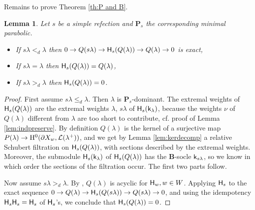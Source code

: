 \documentclass[sn-mathphys-num]{sn-jnl}%
\newcommand{\Ll}{\mathcal L}
\newcommand{\sk}{{\sf k}}
\newcommand{\sH}{{\sf H}}
\newcommand{\fb}{\mathbf B}
\newcommand{\bp}{\mathbf P}
\newtheorem{lemma}[theorem]{Lemma}
\theoremstyle{definition}
\begin{document}
Remains to prove Theorem \ref{th:P and B}.
\begin{lemma}\label{lem:inducing Q}
Let $s$ be a simple refection and $\bp_s$ the corresponding minimal parabolic. 
\begin{itemize}
\item If $s\lambda<_d\lambda$ then $0\to Q(s\lambda)\to{\sH_s}(Q(\lambda))\to Q(\lambda)\to 0$ is exact,
\item If $s\lambda=\lambda$ then ${\sH_s}(Q(\lambda))=Q(\lambda)$,
\item If $s\lambda>_d\lambda$ then ${\sH_s}(Q(\lambda))=0$.
\end{itemize}
\end{lemma}
\begin{proof}
First assume $s\lambda\leq_d\lambda$. Then $\lambda$ is $\bp_s$-dominant. The extremal weights of ${\sH}_s(Q(\lambda))$ are the extremal
weights  $\lambda$, $s\lambda$ of ${\sH}_s(\sk_\lambda)$, because the weights $\nu$ of $Q(\lambda)$ different from $\lambda$ are too short to contribute, cf. proof of Lemma \ref{lem:indpreserve}.
By definition $Q(\lambda)$ is the kernel of a surjective map
 $P(\lambda)\rightarrow {\rm H}^0(\partial X_w,\Ll (\lambda ^+))$, and we get by  Lemma \ref{lem:kerdecomp} a relative Schubert filtration on 
 ${\sH}_s(Q(\lambda))$, with sections described by the extremal weights. Moreover,  the submodule ${\sH}_s(\sk_\lambda)$ of
${\sH}_s(Q(\lambda))$ has the $\fb$-socle $\sk_{s\lambda}$, so we know in which order the sections of the filtration occur. The first two parts follow.




Now assume $s\lambda>_d\lambda$.
 By \cite[Theorem 1.9, (ii)]{WvdK}, $Q(\lambda)$ is acyclic for ${\sH}_w,w\in W$. Applying ${\sH}_s$ to the exact sequence $0\to Q(\lambda)\to{\sH}_s(Q(s\lambda))\to Q(s\lambda)\to 0$, and using the idempotency ${\sH}_s{\sH}_s={\sH}_s$ of ${\sH}_s$'s, we conclude that ${\sH}_s(Q(\lambda))=0$.
\end{proof}
\end{document}
